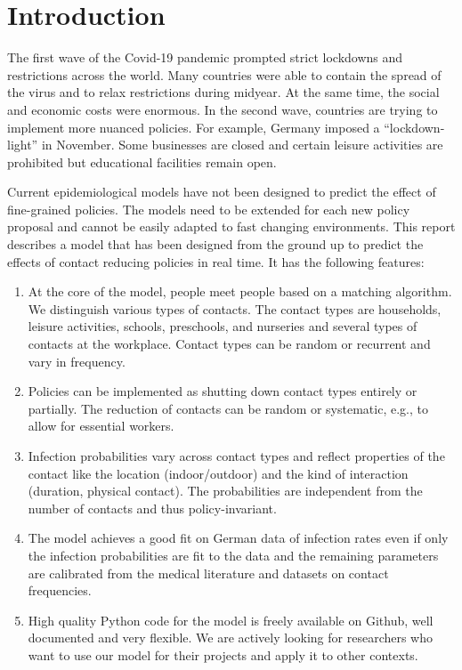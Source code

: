 \section{Introduction}
\label{sec:introduction}

The first wave of the Covid-19 pandemic prompted strict lockdowns and restrictions
across the world. Many countries were able to contain the spread of the virus and to
relax restrictions during midyear. At the same time, the social and economic costs were
enormous. In the second wave, countries are trying to implement more nuanced policies.
For example, Germany imposed a ``lockdown-light'' in November. Some businesses are
closed and certain leisure activities are prohibited but educational facilities remain
open.

Current epidemiological models have not been designed to predict the effect of
fine-grained policies. The models need to be extended for each new policy proposal and
cannot be easily adapted to fast changing environments. This report describes a model
that has been designed from the ground up to predict the effects of contact reducing
policies in real time. It has the following features:

\begin{enumerate}
    \item At the core of the model, people meet people based on a matching algorithm. We
          distinguish various types of contacts. The contact types are households,
          leisure activities, schools, preschools, and nurseries and several types of
          contacts at the workplace. Contact types can be random or recurrent and vary
          in frequency.

    \item Policies can be implemented as shutting down contact types entirely or
          partially. The reduction of contacts can be random or systematic, e.g., to
          allow for essential workers.

    \item Infection probabilities vary across contact types and reflect properties of
          the contact like the location (indoor/outdoor) and the kind of interaction
          (duration, physical contact). The probabilities are independent from the
          number of contacts and thus policy-invariant.

    \item The model achieves a good fit on German data of infection rates even if only
          the infection probabilities are fit to the data and the remaining parameters
          are calibrated from the medical literature and datasets on contact
          frequencies.

    \item High quality Python code for the model is freely available on Github, well
          documented and very flexible\footnotemark. We are actively looking for
          researchers who want to use our model for their projects and apply it to other
          contexts.
\end{enumerate}

